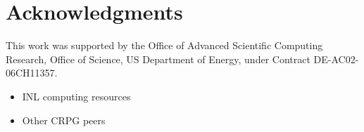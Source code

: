 \section*{Acknowledgments}

This work was supported by the Office of Advanced Scientific Computing Research,
Office of Science, US Department of Energy, under Contract DE-AC02-06CH11357.

\begin{itemize}[noitemsep]
  \item INL computing resources
  \item Other CRPG peers
\end{itemize}